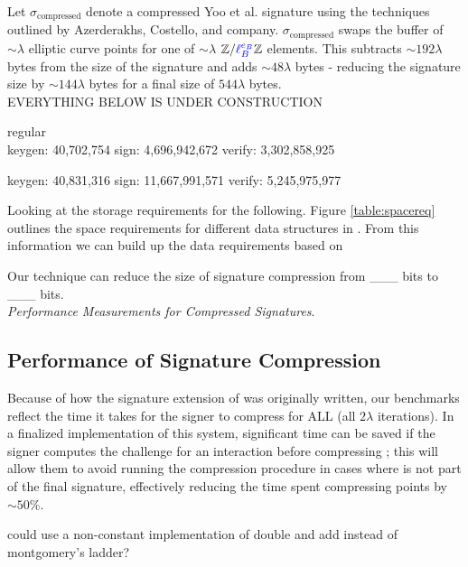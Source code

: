 Let $\sigma_{\text{compressed}}$ denote a compressed Yoo et al. signature using the techniques outlined by Azerderakhs, Costello, and company. $\sigma_{\text{compressed}}$ swaps the buffer of $\sim\lambda$ elliptic curve points for one of $\sim\lambda$ $\mathbb{Z}/\textcolor{blue}{\ell_{B}^{e_B}}\mathbb{Z}$ elements. This subtracts $\sim192\lambda$ bytes from the size of the signature and adds $\sim48\lambda$ bytes - reducing the signature size by $\sim144\lambda$ bytes for a final size of $544\lambda$ bytes.\\

EVERYTHING BELOW IS UNDER CONSTRUCTION

regular\\
keygen:    40,702,754
sign:   4,696,942,672
verify: 3,302,858,925

keygen:    40,831,316
sign:  11,667,991,571
verify: 5,245,975,977

Looking at the storage requirements for the following. Figure \ref{table:spacereq} outlines the space requirements for different data structures in \sidh. From this information we can build up the data requirements based on  

Our technique can reduce the size of \sidh signature compression from \_\_\_ bits to \_\_\_ bits.\\

\noindent
\textit{Performance Measurements for Compressed Signatures}.

\subsection{Performance of Signature Compression}

Because of how the signature extension of \sidh was originally written, our benchmarks reflect the time it takes for the signer to compress  for ALL  (all $2\lambda$ iterations). In a finalized implementation of this system, significant time can be saved if the signer computes the challenge for an interaction before compressing ; this will allow them to avoid running the compression procedure in cases where  is not part of the final signature, effectively reducing the time spent compressing points by $\sim50\%$.

could use a non-constant implementation of double and add instead of montgomery's ladder? 

